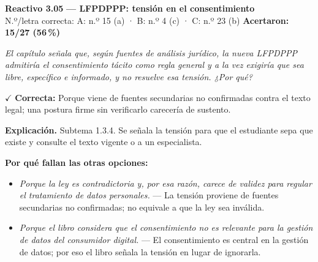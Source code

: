 \documentclass[10pt,letterpaper]{article}
\begin{document}
\begin{minipage}{\textwidth}
{\color{guinda}\textbf{Reactivo 3.05}} \textbf{— LFPDPPP: tensión en el consentimiento}\\[-1pt]
{\scriptsize N.º/letra correcta: A: n.º 15 (a) · B: n.º 4 (c) · C: n.º 23 (b) \hfill \textbf{Acertaron: 15/27 (56\,\%)}}

\textit{El capítulo señala que, según fuentes de análisis jurídico, la nueva LFPDPPP admitiría el consentimiento tácito como regla general y a la vez exigiría que sea libre, específico e informado, y no resuelve esa tensión. ¿Por qué?}

\textcolor{verde}{$\checkmark$} \textbf{Correcta:} Porque viene de fuentes secundarias no confirmadas contra el texto legal; una postura firme sin verificarlo carecería de sustento.

\textbf{Explicación.} Subtema 1.3.4. Se señala la tensión para que el estudiante sepa que existe y consulte el texto vigente o a un especialista.

\textbf{Por qué fallan las otras opciones:}
\begin{itemize}[itemsep=0pt,topsep=1pt,leftmargin=1.3em,parsep=0pt]
\item[\textcolor{rojo}{$\times$}] \textit{Porque la ley es contradictoria y, por esa razón, carece de validez para regular el tratamiento de datos personales.} --- La tensión proviene de fuentes secundarias no confirmadas; no equivale a que la ley sea inválida.
\item[\textcolor{rojo}{$\times$}] \textit{Porque el libro considera que el consentimiento no es relevante para la gestión de datos del consumidor digital.} --- El consentimiento es central en la gestión de datos; por eso el libro señala la tensión en lugar de ignorarla.
\end{itemize}
\end{minipage}\par\vspace{5pt}{\color{gray!40}\hrule}\vspace{5pt}
\end{document}

